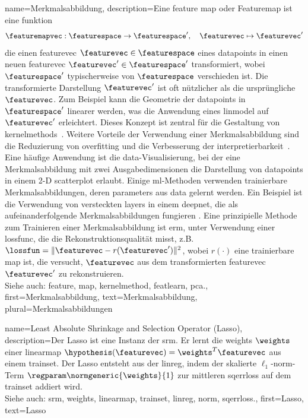 {{{{
{name={Merkmalsabbildung}, 
description={Eine \gls{feature} \gls{map} oder Featuremap ist eine \gls{funktion} 
$$
\featuremapvec: \featurespace \rightarrow \featurespace', \quad \featurevec \mapsto \featurevec'
$$
die einen \gls{featurevec} $\featurevec \in \featurespace$ eines \glspl{datapoint} in einen neuen \gls{featurevec} $\featurevec' \in \featurespace'$ transformiert, 
wobei $\featurespace'$ typischerweise von $\featurespace$ verschieden ist. 
Die transformierte Darstellung $\featurevec'$ ist oft nützlicher als die ursprüngliche $\featurevec$. 
Zum Beispiel kann die Geometrie der \glspl{datapoint} in $\featurespace'$ linearer werden, was die Anwendung eines \gls{linmodel} auf $\featurevec'$ erleichtert. 
Dieses Konzept ist zentral für die Gestaltung von \glspl{kernelmethod}~\cite{LearningKernelsBook}. 
Weitere Vorteile der Verwendung einer Merkmalsabbildung sind die Reduzierung von \gls{overfitting} und die Verbesserung der \gls{interpretierbarkeit}~\cite{Ribeiro2016}. 
Eine häufige Anwendung ist die \gls{data}-Visualisierung, bei der eine Merkmalsabbildung mit zwei Ausgabedimensionen die Darstellung von \glspl{datapoint} in einem 2-D \gls{scatterplot} erlaubt. 
Einige \gls{ml}-Methoden verwenden trainierbare Merkmalsabbildungen, deren \glspl{parameter} aus \gls{data} gelernt werden. 
Ein Beispiel ist die Verwendung von versteckten \glspl{layer} in einem \gls{deepnet}, die als aufeinanderfolgende Merkmalsabbildungen fungieren \cite{MallatUnderstandingDeepLearning}. 
Eine prinzipielle Methode zum Trainieren einer Merkmalsabbildung ist \gls{erm}, unter Verwendung einer \gls{lossfunc}, die die Rekonstruktionsqualität misst,
 z.B. $\lossfun = \|\featurevec - r(\featurevec')\|^2$, wobei $r(\cdot)$ eine trainierbare \gls{map} ist, die versucht, $\featurevec$ aus dem transformierten \gls{featurevec} $\featurevec'$ zu rekonstruieren.
\\
Siehe auch: \gls{feature}, \gls{map}, \gls{kernelmethod}, \gls{featlearn}, \gls{pca}.},
first={Merkmalsabbildung},
text={Merkmalsabbildung},
plural={Merkmalsabbildungen}
}

{name={Least Absolute Shrinkage and Selection Operator (Lasso)}, 
 description={Der Lasso ist eine 
	Instanz der \gls{srm}. Er lernt die \gls{weights} $\weights$ einer \gls{linearmap} 
	$\hypothesis(\featurevec) = \weights^{T} \featurevec$ aus einem \gls{trainset}. 
	Der Lasso entsteht aus der \gls{linreg}, indem der skalierte $\ell_{1}$-\gls{norm}-Term 
	$\regparam \normgeneric{\weights}{1}$ zur mittleren \gls{sqerrloss} auf dem \gls{trainset} addiert wird.
	\\
	Siehe auch: \gls{srm}, \gls{weights}, \gls{linearmap}, \gls{trainset}, \gls{linreg}, \gls{norm}, \gls{sqerrloss}.},
 first={Lasso},
 text={Lasso} 
}

}}}}
